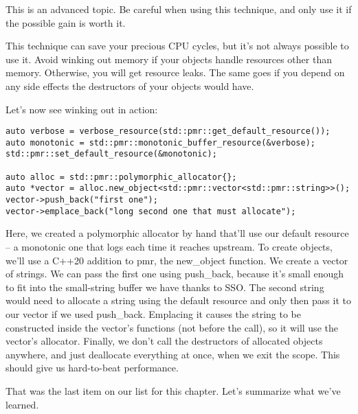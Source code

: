 \begin{tcolorbox}[colback=blue!5!white,colframe=blue!75!black, title=Note]
\hspace*{0.7cm}This is an advanced topic. Be careful when using this technique, and only use it if the possible gain is worth it.
\end{tcolorbox}

This technique can save your precious CPU cycles, but it's not always possible to use it. Avoid winking out memory if your objects handle resources other than memory. Otherwise, you will get resource leaks. The same goes if you depend on any side effects the destructors of your objects would have.

Let's now see winking out in action:

\begin{lstlisting}[style=styleCXX]
auto verbose = verbose_resource(std::pmr::get_default_resource());
auto monotonic = std::pmr::monotonic_buffer_resource(&verbose);
std::pmr::set_default_resource(&monotonic);

auto alloc = std::pmr::polymorphic_allocator{};
auto *vector = alloc.new_object<std::pmr::vector<std::pmr::string>>();
vector->push_back("first one");
vector->emplace_back("long second one that must allocate");
\end{lstlisting}

Here, we created a polymorphic allocator by hand that'll use our default resource – a monotonic one that logs each time it reaches upstream. To create objects, we'll use a C++20 addition to pmr, the new\_object function. We create a vector of strings. We can pass the first one using push\_back, because it's small enough to fit into the small-string buffer we have thanks to SSO. The second string would need to allocate a string using the default resource and only then pass it to our vector if we used push\_back. Emplacing it causes the string to be constructed inside the vector's functions (not before the call), so it will use the vector's allocator. Finally, we don't call the destructors of allocated objects anywhere, and just deallocate everything at once, when we exit the scope. This should give us hard-to-beat performance.

That was the last item on our list for this chapter. Let's summarize what we've learned.














 